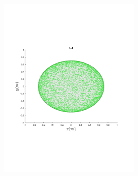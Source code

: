 \begin{figure}
{\begin{subfigure}{0.5\textwidth}
\begin{subfigure}[b]{0.5\textwidth}
        \includegraphics[trim={1cm 7cm 1cm 7cm},
        width=\textwidth]{figures/method/FunnelSimOverlaid1funnel-1}
      \end{subfigure}%
      \begin{subfigure}[b]{0.5\textwidth}

\end{subfigure}
\end{subfigure}}
\end{figure}
